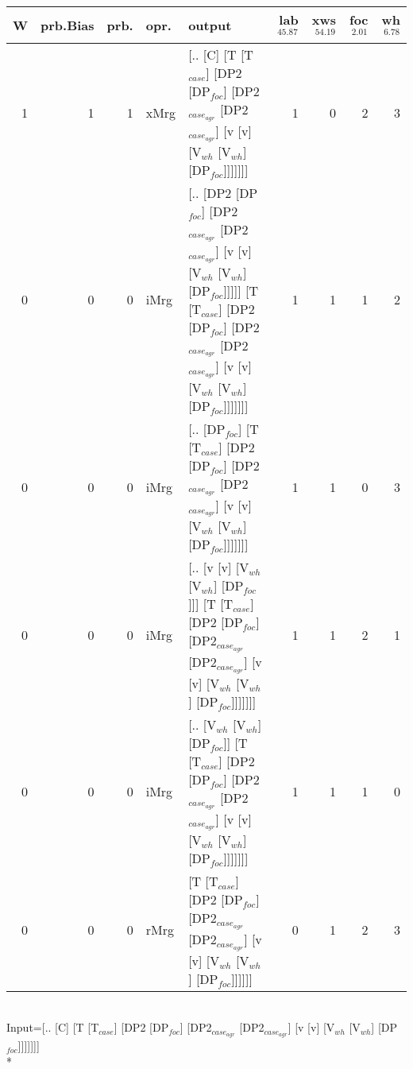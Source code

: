 \begin{tabularx}{\linewidth}{rrrlXrrrr}
\hline
   W &   prb.Bias &   prb. & opr.   & output                                                                                                                                                                    &   lab$^{45.87}$ &   xws$^{54.19}$ &   foc$^{2.01}$ &   wh$^{6.78}$ \\
\hline
   1 &       1 &   1 & xMrg & [.. [C] [T [T$_{case}$] [DP2 [DP$_{foc}$] [DP2$_{case_{agr}}$ [DP2$_{case_{agr}}$] [v [v] [V$_{wh}$ [V$_{wh}$] [DP$_{foc}$]]]]]]]                                                                         &             1 &             0 &          2 &        3 \\
   0 &       0 &   0 & iMrg & [.. [DP2 [DP$_{foc}$] [DP2$_{case_{agr}}$ [DP2$_{case_{agr}}$] [v [v] [V$_{wh}$ [V$_{wh}$] [DP$_{foc}$]]]]] [T [T$_{case}$] [DP2 [DP$_{foc}$] [DP2$_{case_{agr}}$ [DP2$_{case_{agr}}$] [v [v] [V$_{wh}$ [V$_{wh}$] [DP$_{foc}$]]]]]]] &             1 &             1 &          1 &        2 \\
   0 &       0 &   0 & iMrg & [.. [DP$_{foc}$] [T [T$_{case}$] [DP2 [DP$_{foc}$] [DP2$_{case_{agr}}$ [DP2$_{case_{agr}}$] [v [v] [V$_{wh}$ [V$_{wh}$] [DP$_{foc}$]]]]]]]                                                                    &             1 &             1 &          0 &        3 \\
   0 &       0 &   0 & iMrg & [.. [v [v] [V$_{wh}$ [V$_{wh}$] [DP$_{foc}$]]] [T [T$_{case}$] [DP2 [DP$_{foc}$] [DP2$_{case_{agr}}$ [DP2$_{case_{agr}}$] [v [v] [V$_{wh}$ [V$_{wh}$] [DP$_{foc}$]]]]]]]                                              &             1 &             1 &          2 &        1 \\
   0 &       0 &   0 & iMrg & [.. [V$_{wh}$ [V$_{wh}$] [DP$_{foc}$]] [T [T$_{case}$] [DP2 [DP$_{foc}$] [DP2$_{case_{agr}}$ [DP2$_{case_{agr}}$] [v [v] [V$_{wh}$ [V$_{wh}$] [DP$_{foc}$]]]]]]]                                                      &             1 &             1 &          1 &        0 \\
   0 &       0 &   0 & rMrg & [T [T$_{case}$] [DP2 [DP$_{foc}$] [DP2$_{case_{agr}}$ [DP2$_{case_{agr}}$] [v [v] [V$_{wh}$ [V$_{wh}$] [DP$_{foc}$]]]]]]                                                                                  &             0 &             1 &          2 &        3 \\
\hline
\end{tabularx}\endgroup\\
\begingroup\scriptsize Input=[.. [C] [T [T$_{case}$] [DP2 [DP$_{foc}$] [DP2$_{case_{agr}}$ [DP2$_{case_{agr}}$] [v [v] [V$_{wh}$ [V$_{wh}$] [DP$_{foc}$]]]]]]]\\*
